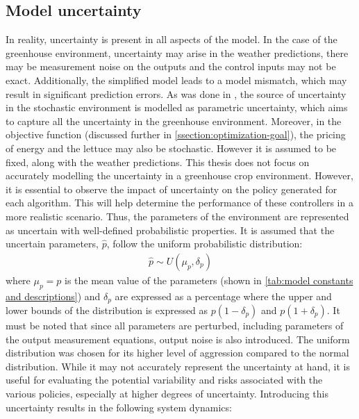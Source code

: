 \subsection{Model uncertainty}
In reality, uncertainty is present in all aspects of the model. In the case of the greenhouse environment, uncertainty may arise in the weather predictions, there may be measurement noise on the outputs and the control inputs may not be exact. Additionally, the simplified model leads to a model mismatch, which may result in significant prediction errors.  As was done in \cite{boersmaRobustSamplebasedModel2022, lubbersAutonomousGreenhouseClimate2023}, the source of uncertainty in the stochastic environment is modelled as parametric uncertainty, which aims to capture all the uncertainty in the greenhouse environment. Moreover, in the objective function (discussed further in \autoref{ssection:optimization-goal}), the pricing of energy and the lettuce may also be stochastic. However it is assumed to be fixed, along with the weather predictions.
This thesis does not focus on accurately modelling the uncertainty in a greenhouse crop environment. However, it is essential to observe the impact of uncertainty on the policy generated for each algorithm. This will help determine the performance of these controllers in a more realistic scenario. Thus, the parameters of the environment are represented as uncertain with well-defined probabilistic properties. It is assumed that the uncertain parameters, $\hat{p}$, follow the uniform probabilistic distribution:
\begin{equation}
	\label{eq:uncertainty_model}
	\begin{aligned}
		\hat{p} \sim U(\mu_p, \delta_p)  
	\end{aligned}
\end{equation}
where $\mu_p = p$ is the mean value of the parameters  (shown in \autoref{tab:model constants and descriptions}) and $\delta_p$ are expressed as a percentage where the upper and lower bounds of the distribution is expressed as $p(1-\delta_p)$ and $p(1+\delta_p)$. It must be noted that since all parameters are perturbed, including parameters of the output measurement equations, output noise is also introduced. The uniform distribution was chosen for its higher level of aggression compared to the normal distribution. While it may not accurately represent the uncertainty at hand, it is  useful for evaluating the potential variability and risks associated with the various policies, especially at higher degrees of uncertainty. Introducing this uncertainty results in the following system dynamics:

